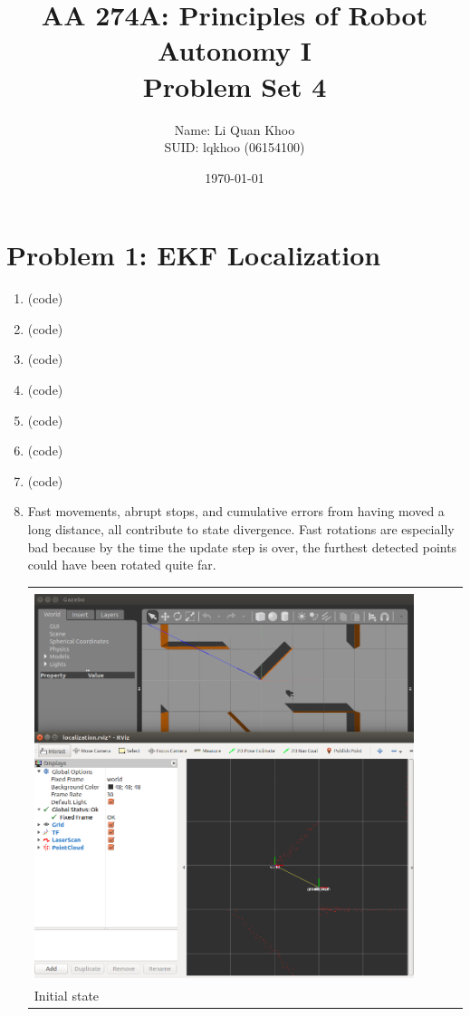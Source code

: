 \documentclass{article}
\title{AA 274A: Principles of Robot Autonomy I \\ Problem Set 4}
\author{Name: Li Quan Khoo     \\ SUID: lqkhoo (06154100)}
\date{\today}
\begin{document}
\maketitle
\pagestyle{fancy} 

\section*{Problem 1: EKF Localization}
\begin{enumerate}[label=(\roman*)]
\item %
(code)

\item %
(code)

\item %
(code)

\item %
(code)

\item %
(code)

\item %
(code)

\item %
(code)

\item %
Fast movements, abrupt stops, and cumulative errors from having moved a long distance, all contribute to state divergence. Fast rotations are especially bad because by the time the update step is over, the furthest detected points could have been rotated quite far.

\begin{tabular}[t]{l}
	\hline \\
	\includegraphics[width=0.9\textwidth]{img/p1-initial.png} \\
	\hline
	Initial state \\
\end{tabular}


\end{enumerate}
\end{document}

